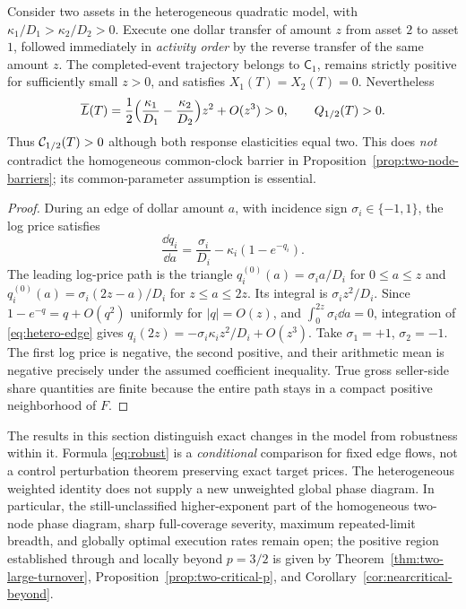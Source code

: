 \documentclass[review,hidelinks,onefignum,onetabnum]{siamonline250211}%
\begin{document}
\begin{proposition}
\label{prop:hetero-two}
Consider two assets in the heterogeneous quadratic model, with
$\kappa_1/D_1>\kappa_2/D_2>0$. Execute one dollar transfer
of amount $z$ from asset $2$ to asset $1$, followed immediately
in \emph{activity order} by the reverse transfer of the same
amount $z$. The completed-event trajectory belongs to
$\mathsf C_1$, remains strictly positive for sufficiently small
$z>0$, and satisfies $X_1(T)=X_2(T)=0$. Nevertheless
\begin{equation}\label{eq:hetero-two-loss}
 \overline L(T)=\frac12\Bigl(\frac{\kappa_1}{D_1}
                 -\frac{\kappa_2}{D_2}\Bigr)z^2+O(z^3)>0,
 \qquad Q_{1/2}(T)>0.
\end{equation}
Thus $\mathcal{C}_{1/2}(T)>0$ although both response elasticities
equal two. This does \emph{not} contradict the homogeneous
common-clock barrier in Proposition~\ref{prop:two-node-barriers};
its common-parameter assumption is essential.
\end{proposition}
\begin{proof}
During an edge of dollar amount $a$, with incidence sign
$\sigma_i\in\{-1,1\}$, the log price satisfies
\begin{equation}\label{eq:hetero-edge}
 \frac{\dd q_i}{\dd a}=\frac{\sigma_i}{D_i}
             -\kappa_i(1-e^{-q_i}).
\end{equation}
The leading log-price path is the triangle
$q_i^{(0)}(a)=\sigma_i a/D_i$ for $0\le a\le z$ and
$q_i^{(0)}(a)=\sigma_i(2z-a)/D_i$ for $z\le a\le2z$.
Its integral is $\sigma_i z^2/D_i$. Since
$1-e^{-q}=q+O(q^2)$ uniformly for $|q|=O(z)$, and
$\int_0^{2z}\sigma_i\dd a=0$, integration of
\eqref{eq:hetero-edge} gives
$q_i(2z)=-\sigma_i\kappa_i z^2/D_i+O(z^3)$.
Take $\sigma_1=+1$, $\sigma_2=-1$. The first log price is
negative, the second positive, and their arithmetic mean is
negative precisely under the assumed coefficient inequality.
True gross seller-side share quantities are finite because the
entire path stays in a compact positive neighborhood of $F$.
\end{proof}

The results in this section distinguish exact changes in the model
from robustness within it. Formula \eqref{eq:robust} is a
\emph{conditional} comparison for fixed edge flows, not a
control perturbation theorem preserving exact target prices. The
heterogeneous weighted identity does not supply a new
unweighted global phase diagram. In particular, the still-unclassified higher-exponent
part of the homogeneous two-node phase diagram, sharp
full-coverage severity, maximum repeated-limit breadth,
and globally optimal execution rates remain open; the
positive region established through and locally beyond
$p=3/2$ is given by
Theorem~\ref{thm:two-large-turnover},
Proposition~\ref{prop:two-critical-p}, and
Corollary~\ref{cor:nearcritical-beyond}.
\end{document}
